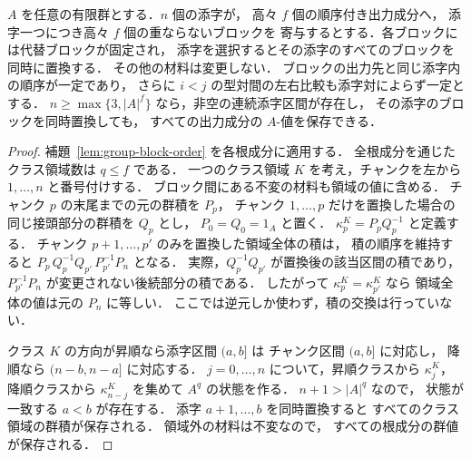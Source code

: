 \begin{lemma}[有限群における複数成分同時の区間短縮]
\label{lem:group-interval}
$A$ を任意の有限群とする．$n$ 個の添字が，
高々 $f$ 個の順序付き出力成分へ，
添字一つにつき高々 $f$ 個の重ならないブロックを
寄与するとする．各ブロックには代替ブロックが固定され，
添字を選択するとその添字のすべてのブロックを同時に置換する．
その他の材料は変更しない．
ブロックの出力先と同じ添字内の順序が一定であり，
さらに $i<j$ の型対間の左右比較も添字対によらず一定とする．
$n\ge\max\{3,|A|^f\}$ なら，非空の連続添字区間が存在し，
その添字のブロックを同時置換しても，
すべての出力成分の $A$-値を保存できる．
\end{lemma}
\begin{proof}
補題~\ref{lem:group-block-order} を各根成分に適用する．
全根成分を通じたクラス領域数は $q\le f$ である．
一つのクラス領域 $K$ を考え，チャンクを左から
$1,\ldots,n$ と番号付けする．
ブロック間にある不変の材料も領域の値に含める．
チャンク $p$ の末尾までの元の群積を $P_p$，
チャンク $1,\ldots,p$ だけを置換した場合の
同じ接頭部分の群積を $Q_p$ とし，
$P_0=Q_0=1_A$ と置く．
\(\kappa^K_p=P_pQ_p^{-1}\)
と定義する．
チャンク $p+1,\ldots,p'$ のみを置換した領域全体の積は，
積の順序を維持すると
\(P_p\,Q_p^{-1}Q_{p'}\,P_{p'}^{-1}P_n\)
となる．
実際，$Q_p^{-1}Q_{p'}$ が置換後の該当区間の積であり，
$P_{p'}^{-1}P_n$ が変更されない後続部分の積である．
したがって
$\kappa^K_p=\kappa^K_{p'}$ なら
領域全体の値は元の $P_n$ に等しい．
ここでは逆元しか使わず，積の交換は行っていない．

クラス $K$ の方向が昇順なら添字区間 $(a,b]$ は
チャンク区間 $(a,b]$ に対応し，
降順なら $(n-b,n-a]$ に対応する．
$j=0,\ldots,n$ について，昇順クラスから
$\kappa^K_j$，降順クラスから
$\kappa^K_{n-j}$ を集めて $A^q$ の状態を作る．
$n+1>|A|^q$ なので，
状態が一致する $a<b$ が存在する．
添字 $a+1,\ldots,b$ を同時置換すると
すべてのクラス領域の群積が保存される．
領域外の材料は不変なので，
すべての根成分の群値が保存される．
\end{proof}

